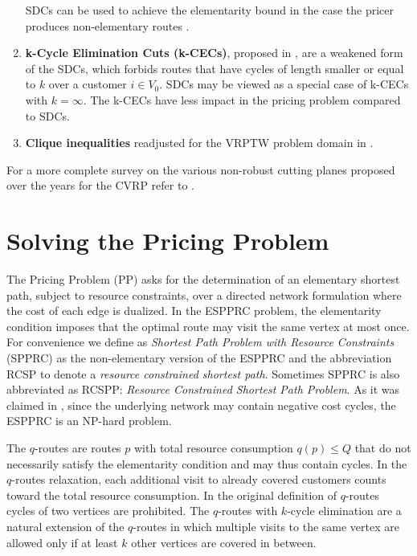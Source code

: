 \begin{enumerate}
	      SDCs can be used to achieve the elementarity bound in the case
	      the pricer produces non-elementary routes \parencite{contardo2014}.
	\item \textbf{k-Cycle Elimination Cuts (k-CECs)}, proposed in \textcite{contardo2014},
	      are a weakened form of the SDCs, which forbids
	      routes that have cycles of length smaller or equal to $k$ over a customer $i \in V_0$.
	      SDCs may be viewed as a special case of k-CECs with $k = \infty$.
	      The k-CECs have less impact in the pricing problem compared to SDCs.
	\item \textbf{Clique inequalities} readjusted for the VRPTW problem domain in \textcite{spoorendonk2010clique}.
\end{enumerate}

For a more complete survey on the various non-robust cutting planes
proposed over the years for the CVRP refer to \textcite{costa2019}.

\section{Solving the Pricing Problem}
\label{sec:solving-the-pricing-problem}

The Pricing Problem (PP) asks for the determination of an elementary shortest path,
subject to resource constraints,
over a directed network formulation where the cost of each edge
is dualized.
In the ESPPRC problem, the elementarity condition imposes
that the optimal route may visit the same vertex at most once.
For convenience we define as \textit{Shortest Path Problem with Resource Constraints} (SPPRC)
as the non-elementary version of the ESPPRC and the abbreviation RCSP
to denote a \textit{resource constrained shortest path}.
Sometimes SPPRC is also abbreviated as RCSPP: \textit{Resource Constrained Shortest Path Problem}.
As it was claimed in \textcite{dror1994},
since the underlying network may contain negative cost cycles,
the ESPPRC is an NP-hard problem.

\medskip

The $q$-routes \parencite{christofides1981exact}
are routes $p$ with total resource consumption $q(p) \le Q$
that do not necessarily satisfy the elementarity condition and may thus contain cycles.
In the $q$-routes relaxation, each additional visit to already covered customers
counts toward the total resource consumption.
In the original definition of $q$-routes cycles of two vertices are prohibited.
The $q$-routes with $k$-cycle elimination
are a natural extension of the $q$-routes
in which multiple visits to the same vertex are allowed only
if at least $k$ other vertices are covered in between.

